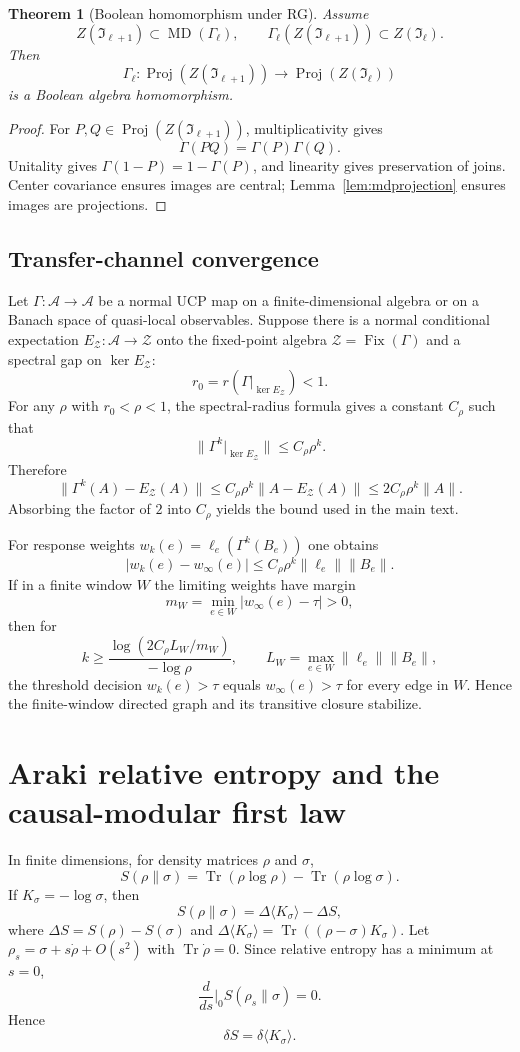 \documentclass[11pt]{article}
\newtheorem{theorem}{Theorem}[section]
\newcommand{\A}{\mathcal A}
\newcommand{\I}{\mathfrak I}
\newcommand{\Z}{\mathcal Z}
\DeclareMathOperator{\Proj}{Proj}
\newcommand{\Tr}{\operatorname{Tr}}
\newcommand{\MD}{\operatorname{MD}}
\newcommand{\Fix}{\operatorname{Fix}}
\begin{document}
\begin{theorem}[Boolean homomorphism under RG]\label{thm:booleanrg}
Assume
\[
Z(\I_{\ell+1})\subset\MD(\Gamma_\ell),
\qquad
\Gamma_\ell(Z(\I_{\ell+1}))\subset Z(\I_\ell).
\]
Then
\[
\Gamma_\ell:\Proj(Z(\I_{\ell+1}))\to\Proj(Z(\I_\ell))
\]
is a Boolean algebra homomorphism.
\end{theorem}

\begin{proof}
For $P,Q\in\Proj(Z(\I_{\ell+1}))$, multiplicativity gives
\[
\Gamma(PQ)=\Gamma(P)\Gamma(Q).
\]
Unitality gives $\Gamma(1-P)=1-\Gamma(P)$, and linearity gives preservation of joins.  Center covariance ensures images are central; Lemma~\ref{lem:mdprojection} ensures images are projections.
\end{proof}

\subsection*{Transfer-channel convergence}
Let $\Gamma:\A\to\A$ be a normal UCP map on a finite-dimensional algebra or on a Banach space of quasi-local observables.  Suppose there is a normal conditional expectation $E_\Z:\A\to\Z$ onto the fixed-point algebra $\Z=\Fix(\Gamma)$ and a spectral gap on $\ker E_\Z$:
\[
r_0=r(\Gamma|_{\ker E_\Z})<1.
\]
For any $\rho$ with $r_0<\rho<1$, the spectral-radius formula gives a constant $C_\rho$ such that
\[
\|\Gamma^k|_{\ker E_\Z}\|\le C_\rho\rho^k.
\]
Therefore
\[
\|\Gamma^k(A)-E_\Z(A)\|\le C_\rho\rho^k\|A-E_\Z(A)\|
\le 2C_\rho\rho^k\|A\|.
\]
Absorbing the factor of $2$ into $C_\rho$ yields the bound used in the main text.

For response weights $w_k(e)=\ell_e(\Gamma^k(B_e))$ one obtains
\[
|w_k(e)-w_\infty(e)|\le C_\rho\rho^k\|\ell_e\|\|B_e\|.
\]
If in a finite window $W$ the limiting weights have margin
\[
m_W=\min_{e\in W}|w_\infty(e)-\tau|>0,
\]
then for
\[
k\ge \frac{\log(2C_\rho L_W/m_W)}{-\log\rho},
\qquad
L_W=\max_{e\in W}\|\ell_e\|\|B_e\|,
\]
the threshold decision $w_k(e)>\tau$ equals $w_\infty(e)>\tau$ for every edge in $W$.  Hence the finite-window directed graph and its transitive closure stabilize.

\section{Araki relative entropy and the causal-modular first law}\label{app:araki}

In finite dimensions, for density matrices $\rho$ and $\sigma$,
\[
S(\rho\|\sigma)=\Tr(\rho\log\rho)-\Tr(\rho\log\sigma).
\]
If $K_\sigma=-\log\sigma$, then
\[
S(\rho\|\sigma)=\Delta\langle K_\sigma\rangle-\Delta S,
\]
where $\Delta S=S(\rho)-S(\sigma)$ and $\Delta\langle K_\sigma\rangle=\Tr((\rho-\sigma)K_\sigma)$.  Let $\rho_s=\sigma+s\dot\rho+O(s^2)$ with $\Tr\dot\rho=0$.  Since relative entropy has a minimum at $s=0$,
\[
\frac{d}{ds}\bigg|_{0}S(\rho_s\|\sigma)=0.
\]
Hence
\[
\delta S=\delta\langle K_\sigma\rangle.
\]
\end{document}
